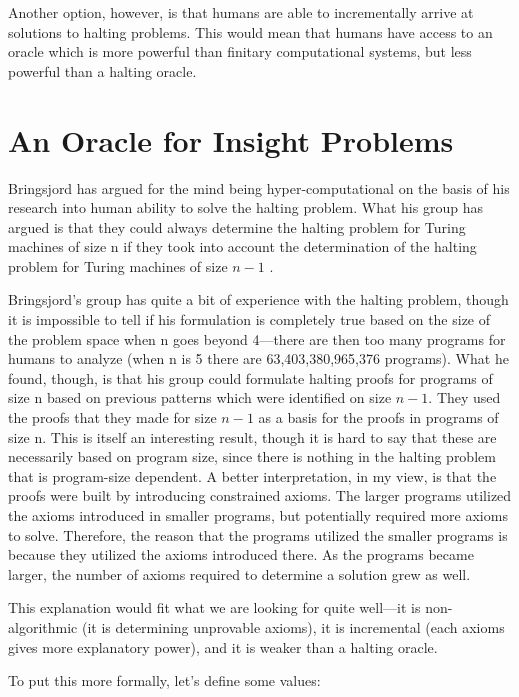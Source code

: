 Another option, however, is that humans are able to incrementally arrive at solutions to halting problems.  This would mean that humans have access to an oracle which is more powerful than finitary computational systems, but less powerful than a halting oracle.

\section{An Oracle for Insight Problems}
Bringsjord has argued for the mind being hyper-computational on the basis of his research into human ability to solve the halting problem.  What his group has argued is that they could always determine the halting problem for Turing machines of size n if they took into account the determination of the halting problem for Turing machines of size $n - 1$ \citep{bringsjord2006}.

Bringsjord's group has quite a bit of experience with the halting problem, though it is impossible to tell if his formulation is completely true based on the size of the problem space when n goes beyond 4---there are then too many programs for humans to analyze (when n is 5 there are 63,403,380,965,376 programs).  What he found, though, is that his group could formulate halting proofs for programs of size n based on previous patterns which were identified on size $n - 1$.  They used the proofs that they made for size $n - 1$ as a basis for the proofs in programs of size n.  This is itself an interesting result, though it is hard to say that these are necessarily based on program size, since there is nothing in the halting problem that is program-size dependent.  A better interpretation, in my view, is that the proofs were built by introducing constrained axioms.  The larger programs utilized the axioms introduced in smaller programs, but potentially required more axioms to solve.  Therefore, the reason that the programs utilized the smaller programs is because they utilized the axioms introduced there.  As the programs became larger, the number of axioms required to determine a solution grew as well.

This explanation would fit what we are looking for quite well---it is non-algorithmic (it is determining unprovable axioms), it is incremental (each axioms gives more explanatory power), and it is weaker than a halting oracle.

To put this more formally, let's define some values: 


